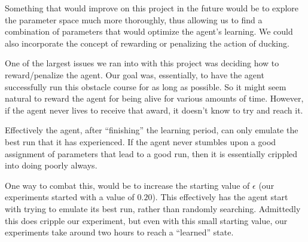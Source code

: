 \documentclass{scrartcl}
\begin{document}
    Something that would improve on this project in the future would be to
    explore the parameter space much more thoroughly, thus allowing us to find
    a combination of parameters that would optimize the agent's learning. We
    could also incorporate the concept of rewarding or penalizing the action of
    ducking.

    One of the largest issues we ran into with this project was deciding how to
    reward/penalize the agent. Our goal was, essentially, to have the agent
    successfully run this obstacle course for as long as possible. So it might
    seem natural to reward the agent for being alive for various amounts of
    time. However, if the agent never lives to receive that award, it doesn't
    know to try and reach it.

    Effectively the agent, after ``finishing'' the learning period, can only
    emulate the best run that it has experienced. If the agent never stumbles
    upon a good assignment of parameters that lead to a good run, then it is
    essentially crippled into doing poorly always.

    One way to combat this, would be to increase the starting value of
    $\epsilon$ (our experiments started with a value of $0.20$). This
    effectively has the agent start with trying to emulate its best run, rather
    than randomly searching. Admittedly this does cripple our experiment, but
    even with this small starting value, our experiments take around two hours
    to reach a ``learned'' state. 



\end{document}
